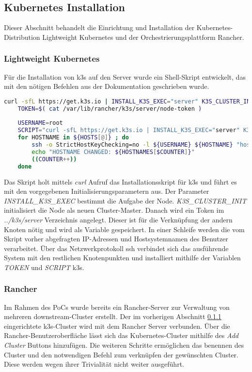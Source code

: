 \subsection{Kubernetes Installation}
Dieser Abschnitt behandelt die Einrichtung und Installation der Kubernetes-Distributi\-on Lightweight Kubernetes und der Orchestrierungsplattform Rancher.


\subsubsection{Lightweight Kubernetes}\label{k3screate}
Für die Installation von k3s auf den Server wurde ein Shell-Skript entwickelt, 
das mit den nötigen Befehlen aus der Dokumentation geschrieben wurde.
\begin{lstlisting}[caption={Ausschnitt aus dem installk3s.sh},captionpos=b,label={lst:k3sintall},language=bash]
    curl -sfL https://get.k3s.io | INSTALL_K3S_EXEC="server" K3S_CLUSTER_INIT=1 sh -
    TOKEN=$( cat /var/lib/rancher/k3s/server/node-token )
    
    USERNAME=root
    SCRIPT="curl -sfL https://get.k3s.io | INSTALL_K3S_EXEC="server" K3S_TOKEN=$TOKEN K3S_URL=https://$ip4:6443 sh - "
    for HOSTNAME in ${HOSTS[@]} ; do
        ssh -o StrictHostKeyChecking=no -l ${USERNAME} ${HOSTNAME} "hostnamectl set-hostname ${HOSTNAMES[$COUNTER]}; ${SCRIPT}"  
        echo "HOSTNAME CHANGED: ${HOSTNAMES[$COUNTER]}"
        ((COUNTER++))
    done
\end{lstlisting}

Das Skript holt mittels \textit{curl} Aufruf das Installationsskript für k3s und führt es mit den vorgegebenen Initialisierungsparametern aus. 
Der Parameter \textit{INSTALL\_K3S\_EXEC} bestimmt die Aufgabe der Node.
\textit{K3S\_CLUSTER\_INIT} initialisiert die Node als neuen Cluster-Master.
Danach wird ein Token im \textit{../k3s/server} Verzeichnis angelegt. Dieser ist für die Verknüpfung der andern Knoten nötig und wird als Variable gespeichert.
In einer Schleife werden die vom Skript vorher abgefragten IP-Adressen und Hostsystemnamen des Benutzer verarbeitet.
Über das Netzwerkprotokoll \ac{ssh} verbindet sich das ausführende System mit den restlichen Knotenpunkten
und installiert mithilfe der Variablen \textit{TOKEN} und \textit{SCRIPT} k3s.

\subsubsection{Rancher}
Im Rahmen des PoCs wurde bereits ein Rancher-Server zur Verwaltung von mehreren downstream-Cluster erstellt.
Der im vorherigen Abschnitt \ref{k3screate} eingerichtete k3s-Cluster wird mit dem Rancher Server verbunden.
Über die Rancher-Benutzeroberfläche lässt sich das Kubernetes-Cluster mithilfe des \textit{Add Cluster} Buttons hinzufügen.
Die weiteren Schritte ermöglichen das benennen des Cluster und den notwendigen Befehl zum verknüpfen der gewünschten Cluster.
Diese werden wegen ihrer Trivialität nicht weiter ausgeführt.

